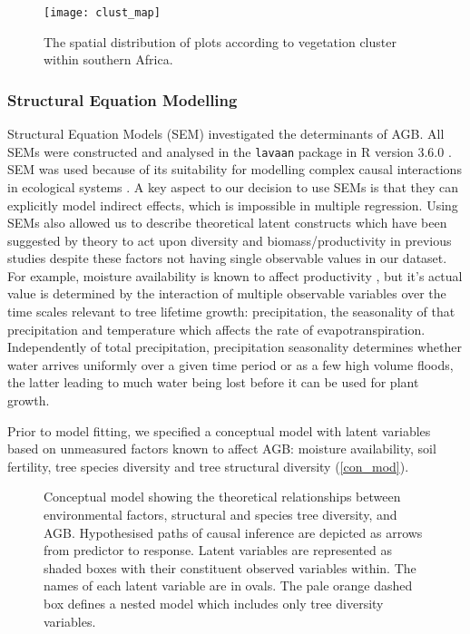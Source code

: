 \documentclass[11pt,a4paper]{article}
\begin{document}


\begin{figure}[H]
\centering
	\texttt{[image: clust\_map]}
	\caption{The spatial distribution of plots according to vegetation cluster within southern Africa.}
	\label{clust_map}
\end{figure}

\subsubsection{Structural Equation Modelling}

Structural Equation Models (SEM) investigated the determinants of AGB. All SEMs were constructed and analysed in the \verb|lavaan| package in R version 3.6.0 \citep{R}. SEM was used because of its suitability for modelling complex causal interactions in ecological systems \citep{Lehmann2014_161-166}. A key aspect to our decision to use SEMs is that they can explicitly model indirect effects, which is impossible in multiple regression. Using SEMs also allowed us to describe theoretical latent constructs which have been suggested by theory to act upon diversity and biomass/productivity in previous studies despite these factors not having single observable values in our dataset. For example, moisture availability is known to affect productivity \citep{}, but it's actual value is determined by the interaction of multiple observable variables over the time scales relevant to tree lifetime growth: precipitation, the seasonality of that precipitation and temperature which affects the rate of evapotranspiration. Independently of total precipitation, precipitation seasonality determines whether water arrives uniformly over a given time period or as a few high volume floods, the latter leading to much water being lost before it can be used for plant growth. 

Prior to model fitting, we specified a conceptual model with latent variables based on unmeasured factors known to affect AGB: moisture availability, soil fertility, tree species diversity and tree structural diversity (\autoref{con_mod}). 

\begin{figure}[H]
\centering
	
	\caption{Conceptual model showing the theoretical relationships between environmental factors, structural and species tree diversity, and AGB. Hypothesised paths of causal inference are depicted as arrows from predictor to response. Latent variables are represented as shaded boxes with their constituent observed variables within. The names of each latent variable are in ovals. The pale orange dashed box defines a nested model which includes only tree diversity variables.}
	\label{con_mod}
\end{figure}
\end{document}

